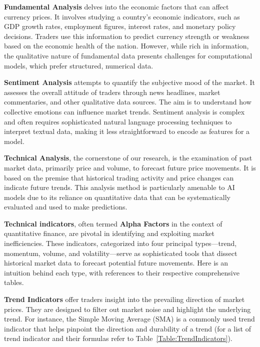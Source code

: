 \textbf{Fundamental Analysis} delves into the economic factors that can affect currency prices. It involves studying a country's economic indicators, such as GDP growth rates, employment figures, interest rates, and monetary policy decisions. Traders use this information to predict currency strength or weakness based on the economic health of the nation. However, while rich in information, the qualitative nature of fundamental data presents challenges for computational models, which prefer structured, numerical data.

\textbf{Sentiment Analysis} attempts to quantify the subjective mood of the market. It assesses the overall attitude of traders through news headlines, market commentaries, and other qualitative data sources. The aim is to understand how collective emotions can influence market trends. Sentiment analysis is complex and often requires sophisticated natural language processing techniques to interpret textual data, making it less straightforward to encode as features for a model.

\textbf{Technical Analysis}, the cornerstone of our research, is the examination of past market data, primarily price and volume, to forecast future price movements. It is based on the premise that historical trading activity and price changes can indicate future trends. This analysis method is particularly amenable to AI models due to its reliance on quantitative data that can be systematically evaluated and used to make predictions.






\textbf{Technical indicators}, often termed \textbf{Alpha Factors} in the context of quantitative finance, are pivotal in identifying and exploiting market inefficiencies. These indicators, categorized into four principal types—trend, momentum, volume, and volatility—serve as sophisticated tools that dissect historical market data to forecast potential future movements. Here is an intuition behind each type, with references to their respective comprehensive tables.

\textbf{Trend Indicators} offer traders insight into the prevailing direction of market prices. They are designed to filter out market noise and highlight the underlying trend. For instance, the Simple Moving Average (SMA) is a commonly used trend indicator that helps pinpoint the direction and durability of a trend (for a list of trend indicator and their formulas refer to Table~\ref{Table:TrendIndicators}).

